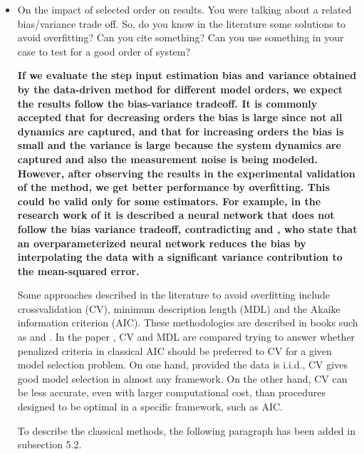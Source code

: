 \documentclass[11pt]{article}
\begin{document}
\begin{itemize}
	\item   On the impact of selected order on results. You were talking about a related bias/variance trade off. So, do you know in the literature some solutions to avoid overfitting? Can you cite something? Can you use something in your case to test for a good order of system?
	
	{\bfseries If we evaluate the step input estimation bias and variance obtained by the data-driven method for different model orders, we expect the results follow the bias-variance tradeoff. It is commonly accepted that for decreasing orders the bias is large since not all dynamics are captured, and that for increasing orders the bias is small and the variance is large because the system dynamics are captured and also the measurement noise is being modeled. However, after observing the results in the experimental validation of the method, we get better performance by overfitting. This could be valid only for some estimators. 
	For example, in the research work of \cite{Neal19} it is described a neural network that does not follow the bias variance tradeoff, contradicting \cite{Geman92} and \cite{Manning08}, who state that an overparameterized neural network reduces the bias by interpolating the data with a significant variance contribution to the mean-squared error.
	
	Some approaches described in the literature to avoid overfitting include crossvalidation (CV), minimum description length (MDL) and the Akaike information criterion (AIC).
	These methodologies are described in books such as \cite{Hastie09}  and \cite{James13}. 
	In the paper \cite{Arlot10}, CV and MDL are compared trying to answer whether penalized criteria in classical AIC should be preferred to CV for a given model selection problem. 
	On one hand, provided the data is i.i.d., CV gives good model selection in almost any framework. 
	On the other hand, CV can be less accurate, even with larger computational cost, than procedures designed to be optimal in a specific framework, such as AIC.
	
	To describe the classical methods, the following paragraph has been added in subsection 5.2.
	}
	
	\color{blue}
	

\end{itemize}
\end{document}
